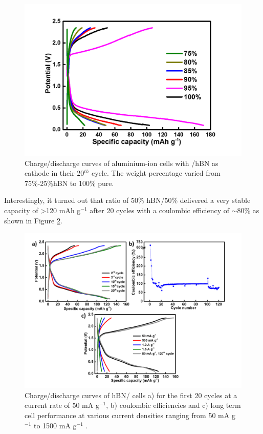 \begin{figure}[tbh!]
\centering
\includegraphics[width=\textwidth]{Figures/BOhBN/hBNBOdifpc}
\caption{Charge/discharge curves of aluminium-ion cells with /hBN as cathode in their 20$^{th}$ cycle. The weight percentage varied from 75\%-25\%hBN to 100\% pure.}
\label{Figures/BOhBN:hBNdifpc}
\end{figure}

Interestingly, it turned out that ratio of 50\% hBN/50\% delivered a very stable capacity of >120 mAh g$^{-1}$ after 20 cycles with a coulombic efficiency of $\sim$80\% as shown in Figure \ref{Figures/BOhBN:hBNBO5050}.

\begin{figure}[tbh!]
\centering
\includegraphics[width=\textwidth]{Figures/BOhBN/hBNBO5050}
\caption{Charge/discharge curves of hBN/  cells a) for the first 20 cycles at a current rate of 50 mA g$^{-1}$, b) coulombic efficiencies and c) long term cell performance at various current densities ranging from 50 mA g$^{-1}$ to 1500 mA g$^{-1}$ .}
\label{Figures/BOhBN:hBNBO5050}
\end{figure}


